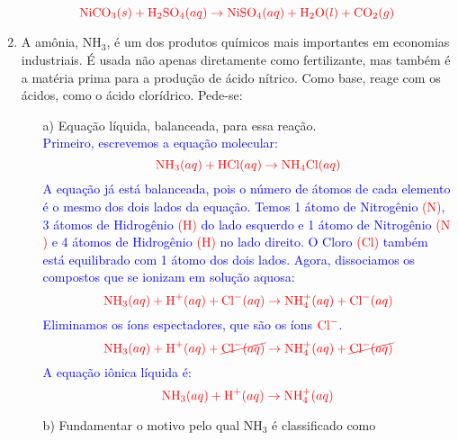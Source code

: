 \documentclass[a4paper, 12pt]{article}
\begin{document}
\begin{enumerate}
          \[
              \textcolor{red}{\text{NiCO}_3 (s) + \text{H}_2\text{SO}_4 (aq) \rightarrow \text{NiSO}_4 (aq) + \text{H}_2\text{O} (l) + \text{CO}_2 (g)}
          \]


    \item A amônia, $\text{NH}_{3}$, é um dos produtos químicos mais importantes
          em economias industriais. É usada não apenas diretamente como fertilizante,
          mas também é a matéria prima para a produção de ácido nítrico. Como base, reage
          com os ácidos, como o ácido clorídrico. Pede-se:
          \begin{enumerate}[align=left, labelsep=-0.5em]
              \item[a)] Equação líquida, balanceada, para essa reação.
                    \\[10pt]
                    \textcolor{blue}{Primeiro, escrevemos a equação molecular:}
                    \[
                        \textcolor{red}{\text{NH}_3 (aq) + \text{HCl} (aq) \rightarrow \text{NH}_4\text{Cl} (aq)}
                    \]
                    \textcolor{blue}{A equação já está balanceada, pois o número de átomos de cada elemento é o mesmo dos dois lados da equação. Temos 1 átomo de Nitrogênio \textcolor{red}{(\(\text{N}\))}, 3 átomos de Hidrogênio \textcolor{red}{(\(\text{H}\))} do lado esquerdo e 1 átomo de Nitrogênio \textcolor{red}{(\(\text{N}\))} e 4 átomos de Hidrogênio \textcolor{red}{(\(\text{H}\))} no lado direito. O Cloro \textcolor{red}{(\(\text{Cl}\))} também está equilibrado com 1 átomo dos dois lados.}
                    \textcolor{blue}{Agora, dissociamos os compostos que se ionizam em solução aquosa:}
                    \[
                        \textcolor{red}{\text{NH}_3 (aq) + \text{H}^+ (aq) + \text{Cl}^- (aq) \rightarrow \text{NH}_4^+ (aq) + \text{Cl}^- (aq)}
                    \]
                    \textcolor{blue}{Eliminamos os íons espectadores, que são os íons \(\textcolor{red}{\text{Cl}^-}\).}
                    \[
                        \textcolor{red}{\text{NH}_3 (aq) + \text{H}^+ (aq) + \cancel{\text{Cl}^- (aq)}  \rightarrow \text{NH}_4^+ (aq) + \cancel{\text{Cl}^- (aq)}}
                    \]
                    \textcolor{blue}{A equação iônica líquida é:}
                    \[
                        \textcolor{red}{\text{NH}_3 (aq) + \text{H}^+ (aq) \rightarrow \text{NH}_4^+ (aq)}
                    \]
              \item[b)] Fundamentar o motivo pelo qual $\text{NH}_{3}$ é classificado como

\end{enumerate}
\end{enumerate}
\end{document}
